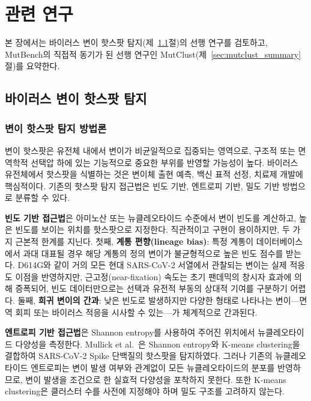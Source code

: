 \chapter{관련 연구}
\label{ch:background}

본 장에서는 바이러스 변이 핫스팟 탐지(제~\ref{sec:bg_hotspot}절)의 선행 연구를 검토하고, MutBench의 직접적 동기가 된 선행 연구인 MutClust(제~\ref{sec:mutclust_summary}절)를 요약한다.


\section{바이러스 변이 핫스팟 탐지}
\label{sec:bg_hotspot}

\subsection{변이 핫스팟 탐지 방법론}
\label{subsec:bg_hotspot_methods}

변이 핫스팟은 유전체 내에서 변이가 비균일적으로 집중되는 영역으로, 구조적 또는 면역학적 선택압 하에 있는 기능적으로 중요한 부위를 반영할 가능성이 높다.
바이러스 유전체에서 핫스팟을 식별하는 것은 변이체 출현 예측, 백신 표적 선정, 치료제 개발에 핵심적이다.
기존의 핫스팟 탐지 접근법은 빈도 기반, 엔트로피 기반, 밀도 기반 방법으로 분류할 수 있다.

\textbf{빈도 기반 접근법}은 아미노산 또는 뉴클레오타이드 수준에서 변이 빈도를 계산하고, 높은 빈도를 보이는 위치를 핫스팟으로 지정한다.
직관적이고 구현이 용이하지만, 두 가지 근본적 한계를 지닌다.
첫째, \textbf{계통 편향(lineage bias)}: 특정 계통이 데이터베이스에서 과대 대표될 경우 해당 계통의 정의 변이가 불균형적으로 높은 빈도 점수를 받는다.
D614G와 같이 거의 모든 현대 SARS-CoV-2 서열에서 관찰되는 변이는 실제 적응도 이점을 반영하지만, 근고정(near-fixation) 속도는 초기 팬데믹의 창시자 효과에 의해 증폭되어, 빈도 데이터만으로는 선택과 유전적 부동의 상대적 기여를 구분하기 어렵다.
둘째, \textbf{희귀 변이의 간과}: 낮은 빈도로 발생하지만 다양한 형태로 나타나는 변이---면역 회피 또는 바이러스 적응을 시사할 수 있는---가 체계적으로 간과된다.

\textbf{엔트로피 기반 접근법}은 Shannon entropy를 사용하여 주어진 위치에서 뉴클레오타이드 다양성을 측정한다.
Mullick et al.~\cite{mullick2021entropy}은 Shannon entropy와 K-means clustering을 결합하여 SARS-CoV-2 Spike 단백질의 핫스팟을 탐지하였다.
그러나 기존의 뉴클레오타이드 엔트로피는 변이 발생 여부와 관계없이 모든 뉴클레오타이드의 분포를 반영하므로, 변이 발생을 조건으로 한 실효적 다양성을 포착하지 못한다.
또한 K-means clustering은 클러스터 수를 사전에 지정해야 하며 밀도 구조를 고려하지 않는다.

